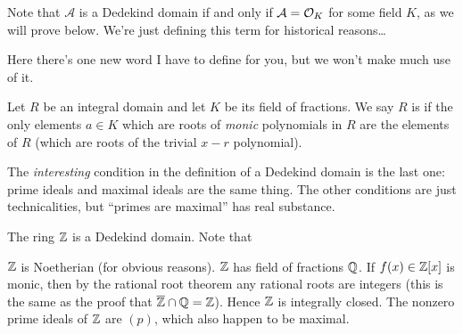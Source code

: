 \begin{remark}
	Note that $\mathcal A$ is a Dedekind domain if and only if $\mathcal A = \mathcal O_K$ for some field
	$K$, as we will prove below. We're just defining this term for historical reasons\dots
\end{remark}

Here there's one new word I have to define for you, but we won't make much use of it.
\begin{definition}
	Let $R$ be an integral domain and let $K$ be its field of fractions.
	We say $R$ is  if
	the only elements $a \in K$ which are roots of \emph{monic} polynomials in $R$
	are the elements of $R$ (which are roots of the trivial $x-r$ polynomial).
\end{definition}
The \emph{interesting} condition in the definition
of a Dedekind domain is the last one: prime ideals and maximal ideals
are the same thing.
The other conditions are just technicalities,
but ``primes are maximal'' has real substance.
\begin{example}
	The ring $\mathbb Z$ is a Dedekind domain.
	Note that
	\begin{itemize}
		\ii $\mathbb Z$ is Noetherian (for obvious reasons).
		\ii $\mathbb Z$ has field of fractions $\mathbb Q$.
		If $f(x) \in \mathbb Z[x]$ is monic, then by the rational root theorem
		any rational roots are integers
		(this is the same as the proof that $\overline{\mathbb Z} \cap \mathbb Q = \mathbb Z$).
		Hence $\mathbb Z$ is integrally closed.
		\ii The nonzero prime ideals of $\mathbb Z$ are $(p)$,
		which also happen to be maximal.
	\end{itemize}
\end{example}

